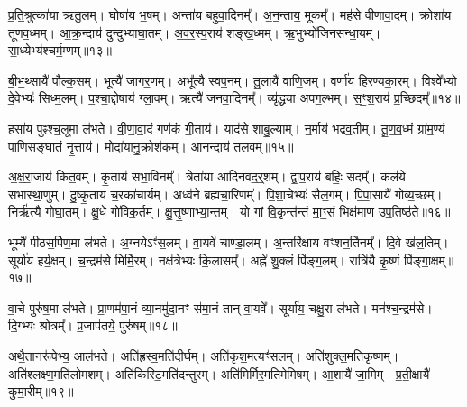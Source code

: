 प्र॒ति॒श्रुत्का॑या ऋतु॒लम्।
घोषा॑य भ॒षम्।
अन्ता॑य बहुवा॒दिनम्᳚।
अ॒न॒न्ताय॒ मूकम्᳚।
मह॑से वीणावा॒दम्।
क्रोशा॑य तूणव॒ध्मम्।
आ॒क्र॒न्दाय॑ दुन्दुभ्याघा॒तम्।
अ॒व॒र॒स्प॒राय॑ शङ्ख॒ध्मम्।
ऋ॒भुभ्यो॑जिनसन्धा॒यम्।
सा॒ध्येभ्य॑श्चर्म॒म्णम्॥१३॥

बी॒भ॒थ्सायै॑ पौल्क॒सम्।
भूत्यै॑ जागर॒णम्।
अभू᳚त्यै स्वप॒नम्।
तु॒लायै॑ वाणि॒जम्।
वर्णा॑य हिरण्यका॒रम्।
विश्वे᳚भ्यो दे॒वेभ्यः॑ सिध्म॒लम्।
प॒श्चा॒द्दो॒षाय॑ ग्ला॒वम्।
ऋत्यै॑ जनवा॒दिनम्᳚।
व्यृ॑द्ध्या अपग॒ल्भम्।
स॒ꣳ॒श॒राय॑ प्र॒च्छिदम्᳚॥१४॥

हसा॑य पुꣴश्च॒लूमा ल॑भते।
वी॒णा॒वा॒दं गण॑कं गी॒ताय॑।
याद॑से शाबु॒ल्याम्।
न॒र्माय॑ भद्रव॒तीम्।
तू॒ण॒व॒ध्मं ग्रा॑म॒ण्यं॑ पाणिसङ्घा॒तं नृ॒त्ताय॑।
मोदा॑यानु॒क्रोश॑कम्।
आ॒न॒न्दाय॑ तल॒वम्॥१५॥

अ॒क्ष॒रा॒जाय॑ कित॒वम्।
कृ॒ताय॑ सभा॒विनम्᳚।
त्रेता॑या आदि\-नव\-द॒र्॒शम्।
द्वा॒प॒राय॑ बहिः॒ सदम्᳚।
कल॑ये सभास्था॒णुम्।
दु॒ष्कृ॒ताय॑ च॒रका॑\-चार्यम्।
अध्व॑ने ब्रह्म\-चा॒रिणम्᳚।
पि॒शा॒चेभ्यः॑ सैल॒गम्।
पि॒पा॒सायै॑ गोव्\-य॒च्छम्।
निर्\mbox{}ऋ॑त्यै गो\-घा॒तम्।
क्षु॒धे गो॑विक॒र्तम्।
क्षु॒त्तृ॒ष्णा\-भ्या॒न्तम्।
यो गां वि॒कृन्त॑न्तं मा॒ꣳ॒सं भिक्ष॑माण उप॒तिष्ठ॑ते॥१६॥

भूम्यै॑ पीठस॒र्पिण॒मा ल॑भते।
अ॒ग्नये\-ऽꣳ॑स॒लम्।
वा॒यवे॑ चाण्डा॒लम्।
अ॒न्तरि॑क्षाय वꣳशन॒र्तिनम्᳚।
दि॒वे ख॑ल॒तिम्।
सूर्या॑य हर्य॒क्षम्।
च॒न्द्रम॑से मिर्मि॒रम्।
नक्ष॑त्रेभ्यः कि॒लासम्᳚।
अह्ने॑ शु॒क्लं पि॑ङ्ग॒लम्।
रात्रि॑यै कृ॒ष्णं पि॑ङ्गा॒क्षम्॥१७॥

वा॒चे पुरु॑ष॒मा ल॑भते।
प्रा॒णम॑पा॒नं व्या॒नमु॑दा॒नꣳ स॑मा॒नं तान् वा॒यवे᳚।
सूर्या॑य॒ चक्षु॒रा ल॑भते।
मन॑श्च॒न्द्रम॑से।
दि॒ग्भ्यः श्रोत्रम्᳚।
प्र॒जा\-प॑तये॒ पुरु॑षम्॥१८॥

अथै॒तानरू॑पेभ्य॒ आल॑भते।
अति॑\-ह्रस्व॒मति॑\-दीर्घम्।
अति॑\-कृश॒मत्यꣳ॑सलम्।
अति॑\-शुक्ल॒मति॑\-कृष्णम्।
अति॑\-श्लक्ष्ण॒\-मति॑\-लोमशम्।
अति॑\-किरिट॒मति॑\-दन्तुरम्।
अति॑\-मिर्मिर॒मति॑\-मेमिषम्।
आ॒शायै॑ जा॒मिम्।
प्र॒ती॒क्षायै॑ कुमा॒रीम्॥१९॥%




\clearpage
{}
\setcounter{anuvakam}{0}

